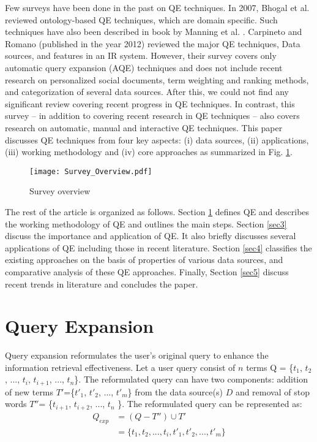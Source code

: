 Few surveys have been done in the past on QE techniques. In 2007, Bhogal et al. \cite{bhogal2007review}  reviewed ontology-based QE techniques, which are domain specific. Such techniques have also been described in book by Manning et al. \cite{Manning:2008:IIR:1394399}.  Carpineto and Romano \cite{carpineto2012survey} (published in the year 2012) reviewed the major QE techniques, Data sources, and features in an IR system. However, their survey covers only automatic query expansion (AQE) techniques and does not include recent research on personalized social documents, term weighting and ranking methods, and categorization of several data sources. After this, we could not find any significant review covering recent progress in QE techniques.   
In contrast, this survey -- in addition to covering recent research in QE techniques -- also covers research on  automatic, manual and interactive QE techniques.  This paper discusses QE techniques from four key aspects: (i) data sources, (ii) applications, (iii) working methodology and (iv) core approaches as summarized in Fig. \ref{fig:a}. 

\begin{figure}[h!]
	\centering 
	\texttt{[image: Survey\_Overview.pdf]}
	\caption{Survey overview}
	\label{fig:a} 
\end{figure}

The rest of the article is organized as follows. Section \ref{sec2} defines QE and describes the working methodology of QE and outlines the main steps. Section \ref{sec3} discuss the importance and application of QE. It also briefly discusses several applications of QE including those in recent literature. Section \ref{sec4} classifies the existing approaches on the basis of properties of various data sources, and comparative analysis of these QE approaches. Finally, Section \ref{sec5} discuss recent trends in literature and concludes the paper.

\section{Query Expansion}
\label{sec2}
Query expansion reformulates the user's original query to enhance the information retrieval effectiveness. Let a user query consist of $n$ terms Q = \{$t_{1}$, $t_2$, ..., $t_i$, $t_{i+1}$, ..., $t_n$\}. The reformulated query can have two components: addition of new terms $T'$=\{$t'_1$, $t'_2$, ..., $t'_m$\} from the data source(s) $D$ and removal of stop words $T''$= \{$t_{i+1}$, $t_{i+2}$, ..., $t_n$ \}.
The reformulated query can be represented as:
\begin{equation}\label{eq:1}
\begin{split}
Q_{exp} & =(Q-T'')\cup T' \\	                                 
& =\{t_{1},t_2, . . .,t_i, t'_1, t'_2,...,t'_m \}
\end{split}
\end{equation}

